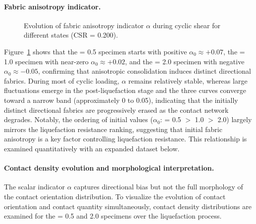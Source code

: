 \paragraph{Fabric anisotropy indicator.}

\begin{figure}[t]
  \centering
  \caption{Evolution of fabric anisotropy indicator $\alpha$ during cyclic shear for different \Kzero{} states (CSR = 0.200).}
  \label{fig:alpha_evolution}
\end{figure}

Figure~\ref{fig:alpha_evolution} shows that the \Kzero{} = 0.5 specimen starts with positive $\alpha_0 \approx +0.07$, the \Kzero{} = 1.0 specimen with near-zero $\alpha_0 \approx +0.02$, and the \Kzero{} = 2.0 specimen with negative $\alpha_0 \approx -0.05$, confirming that anisotropic consolidation induces distinct directional fabrics. During most of cyclic loading, $\alpha$ remains relatively stable, whereas large fluctuations emerge in the post-liquefaction stage and the three curves converge toward a narrow band (approximately 0 to 0.05), indicating that the initially distinct directional fabrics are progressively erased as the contact network degrades. Notably, the ordering of initial values ($\alpha_0$: \Kzero{} = 0.5 $>$ 1.0 $>$ 2.0) largely mirrors the liquefaction resistance ranking, suggesting that initial fabric anisotropy is a key factor controlling liquefaction resistance. This relationship is examined quantitatively with an expanded dataset below.

\paragraph{Contact density evolution and morphological interpretation.}
The scalar indicator $\alpha$ captures directional bias but not the full morphology of the contact orientation distribution. To visualize the evolution of contact orientation and contact quantity simultaneously, contact density distributions are examined for the \Kzero{} = 0.5 and 2.0 specimens over the liquefaction process.

